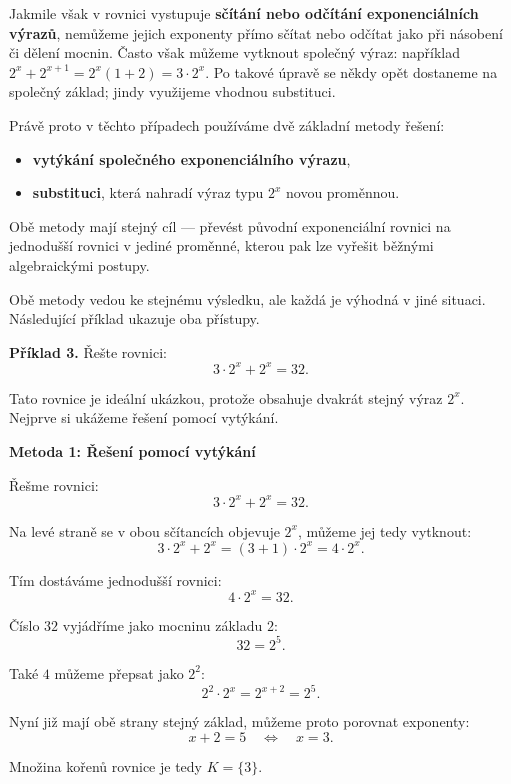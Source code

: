 \documentclass[12pt,a4paper]{article}
\begin{document}
Jakmile však v rovnici vystupuje \textbf{sčítání nebo odčítání exponenciálních výrazů},
nemůžeme jejich exponenty přímo sčítat nebo odčítat jako při násobení či dělení mocnin.
Často však můžeme vytknout společný výraz: například $2^x+2^{x+1}=2^x(1+2)=3\cdot2^x$.
Po takové úpravě se někdy opět dostaneme na společný základ; jindy využijeme vhodnou substituci.

Právě proto v těchto případech používáme dvě základní metody řešení:

\begin{itemize}
    \item \textbf{vytýkání společného exponenciálního výrazu},  
    \item \textbf{substituci}, která nahradí výraz typu $2^x$ novou proměnnou.
\end{itemize}

Obě metody mají stejný cíl — převést původní exponenciální rovnici
na jednodušší rovnici v jediné proměnné, kterou pak lze vyřešit
běžnými algebraickými postupy.


Obě metody vedou ke stejnému výsledku, ale každá je výhodná v jiné situaci.
Následující příklad ukazuje oba přístupy.


\begin{examplebox}
\textbf{Příklad 3.}  
Řešte rovnici:
\[
    3\cdot 2^x + 2^x = 32.
\]
\end{examplebox}

\noindent
Tato rovnice je ideální ukázkou, protože obsahuje dvakrát stejný výraz $2^x$.
Nejprve si ukážeme řešení pomocí vytýkání.


\begin{examplebox}
\textbf{Metoda 1: Řešení pomocí vytýkání}
 
Řešme rovnici:
\[
    3\cdot 2^x + 2^x = 32.
\]

Na levé straně se v obou sčítancích objevuje $2^x$, můžeme jej tedy vytknout:
\[
    3\cdot 2^x + 2^x = (3+1)\cdot 2^x = 4\cdot 2^x.
\]

Tím dostáváme jednodušší rovnici:
\[
    4\cdot 2^x = 32.
\]

Číslo $32$ vyjádříme jako mocninu základu $2$:
\[
    32 = 2^5.
\]

Také $4$ můžeme přepsat jako $2^2$:
\[
    2^2 \cdot 2^x = 2^{x+2} = 2^5.
\]

Nyní již mají obě strany stejný základ, můžeme proto porovnat exponenty:
\[
    x + 2 = 5 \quad \Longleftrightarrow \quad x = 3.
\]

Množina kořenů rovnice je tedy $K=\{3\}$.
\end{examplebox}
\end{document}
